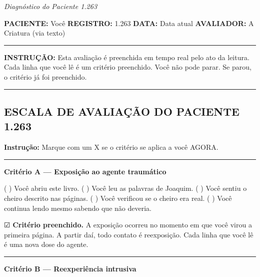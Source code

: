 
\noindent \textit{Diagnóstico do Paciente 1.263}

\noindent \textbf{PACIENTE:} Você
\textbf{REGISTRO:} 1.263
\textbf{DATA:} Data atual
\textbf{AVALIADOR:} A Criatura (via texto)

\vspace{0.5em}\noindent\rule{\textwidth}{0.5pt}\vspace{0.5em}

\noindent \textbf{INSTRUÇÃO:} Esta avaliação é preenchida em tempo real pelo ato da leitura.
Cada linha que você lê é um critério preenchido.
Você não pode parar. Se parou, o critério já foi preenchido.

\vspace{0.5em}\noindent\rule{\textwidth}{0.5pt}\vspace{0.5em}

\subsection*{ESCALA DE AVALIAÇÃO DO PACIENTE 1.263}

\noindent \textbf{Instrução:} Marque com um X se o critério se aplica a você AGORA.

\vspace{0.5em}\noindent\rule{\textwidth}{0.5pt}\vspace{0.5em}

\noindent \textbf{Critério A --- Exposição ao agente traumático}

\noindent ( ) Você abriu este livro.
( ) Você leu as palavras de Joaquim.
( ) Você sentiu o cheiro descrito nas páginas.
( ) Você verificou se o cheiro era real.
( ) Você continua lendo mesmo sabendo que não deveria.

\noindent ☑ \textbf{Critério preenchido.} A exposição ocorreu no momento em que você virou a primeira página. A partir daí, todo contato é reexposição. Cada linha que você lê é uma nova dose do agente.

\vspace{0.5em}\noindent\rule{\textwidth}{0.5pt}\vspace{0.5em}

\noindent \textbf{Critério B --- Reexperiência intrusiva}

